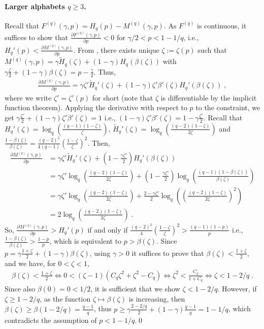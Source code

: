 \documentclass{article}
\theoremstyle{plain}
\theoremstyle{plain}
\theoremstyle{plain}
\theoremstyle{plain}
\theoremstyle{plain}
\theoremstyle{plain}
\theoremstyle{plain}
\theoremstyle{plain}
\theoremstyle{plain}
\theoremstyle{plain}
\theoremstyle{remark}
\theoremstyle{remark}
\theoremstyle{remark}
\theoremstyle{plain}
\begin{document}
\paragraph{Larger alphabets $q\ge 3$.}
Recall that $F^{(q)}(\gamma,p)= H_q(p)-M^{(q)}(\gamma, p)$. As $F^{(q)}$ is continuous,
it suffices to show that $\frac{\partial F^{(q)}(\gamma,p)}{\partial p}< 0$ 
for $\gamma/2< p<1-1/q$,
i.e., $H_q'(p)< \frac{\partial M^{(q)}(\gamma,p)}{\partial p}$. From , there exists unique $\zeta:=\zeta(p)$ such that $M^{(q)}(\gamma,p)=\gamma\tilde{H}_q(\zeta)+(1-\gamma)H_q(\beta(\zeta))$ with $\gamma\frac{\zeta}{2}+(1-\gamma)\beta(\zeta)=p-\frac{\gamma}{2}$. Thus,
\begin{align*}
    \frac{\partial M^{(q)}(\gamma,p)}{\partial p}=\gamma\zeta'\tilde{H}_q'(\zeta)+(1-\gamma)\zeta'\beta'(\zeta)H_q'(\beta(\zeta))\;,
\end{align*}
where we write $\zeta'=\zeta'(p)$ for short
(note that $\zeta$ is differentiable by the implicit function theorem).
Applying the derivative with respect to $p$ to the constraint, we get $\gamma\frac{\zeta'}{2}+(1-\gamma)\zeta'\beta'(\zeta)=1$ i.e., $(1-\gamma)\zeta'\beta'(\zeta)=1-\gamma\frac{\zeta'}{2}$. Recall that $H_q'(\zeta)=\log_q\left(\frac{(q-1)(1-\zeta)}{\zeta}\right)$, $\tilde{H}_q'(\zeta)=\log_q\left(\frac{(q-2)(1-\zeta)}{2\zeta}\right)$ and $\frac{1-\beta(\zeta)}{\beta(\zeta)}=\frac{(q-2)^2}{4(q-1)}\left(\frac{1-\zeta}{\zeta}\right)^2$. Then, 
\begin{align*}
    \frac{\partial M^{(q)}(\gamma,p)}{\partial p}&=\gamma\zeta'\tilde{H}_q'(\zeta)+\left(1-\frac{\gamma\zeta'}{2}\right)H_q'(\beta(\zeta))
    \\&=\gamma\zeta'\log_q\left(\frac{(q-2)(1-\zeta)}{2\zeta}\right)+\left(1-\frac{\gamma\zeta'}{2}\right)\log_q\left(\frac{(q-1)(1-\beta(\zeta))}{\beta(\zeta)}\right)
    \\&=\gamma\zeta'\log_q\left(\frac{(q-2)(1-\zeta)}{2\zeta}\right)+\frac{2-\gamma\zeta'}{2}\log_q\left(\left(\frac{(q-2)(1-\zeta)}{2\zeta}\right)^2\right)
    \\&=2\log_q\left(\frac{(q-2)(1-\zeta)}{2\zeta}\right)\;.
\end{align*}
So, $\frac{\partial M^{(q)}(\gamma,p)}{\partial p}> H_q'(p)$ if and only if $\frac{(q-2)^2}{4}\left(\frac{1-\zeta}{\zeta}\right)^2>\frac{(q-1)(1-p)}{p}$ i.e., $\frac{1-\beta(\zeta)}{\beta(\zeta)}> \frac{1-p}{p}$, which is equivalent to $p> \beta(\zeta)$. Since  $p=\gamma\frac{1+\zeta}{2}+(1-\gamma)\beta(\zeta)$, 
using $\gamma>0$ it suffices to prove that $\beta(\zeta)<\frac{1+\zeta}{2}$, and we have, for
$0<\zeta<1$,
\begin{align*}
    \beta(\zeta)<\frac{1+\zeta}{2}\iff 
    0< (\zeta-1)(C_q\zeta^2+\zeta^2-C_q)
    \iff
    \zeta^2< \frac{C_q}{1+C_q} \iff \zeta<1-2/q\;.
\end{align*}
Since also $\beta(0)=0<1/2$, it is sufficient that
we show $\zeta<1-2/q$.
However, if $\zeta\ge1-2/q$, as the function $\zeta\mapsto\beta(\zeta)$ is increasing, then $\beta(\zeta)\ge\beta(1-2/q)=\frac{q-1}{q}$, thus $p\ge\gamma\frac{2-2/q}{2}+(1-\gamma)\frac{q-1}{q}=1-1/q$, which contradicts the assumption of $p< 1-1/q$.\qed
\end{document}
